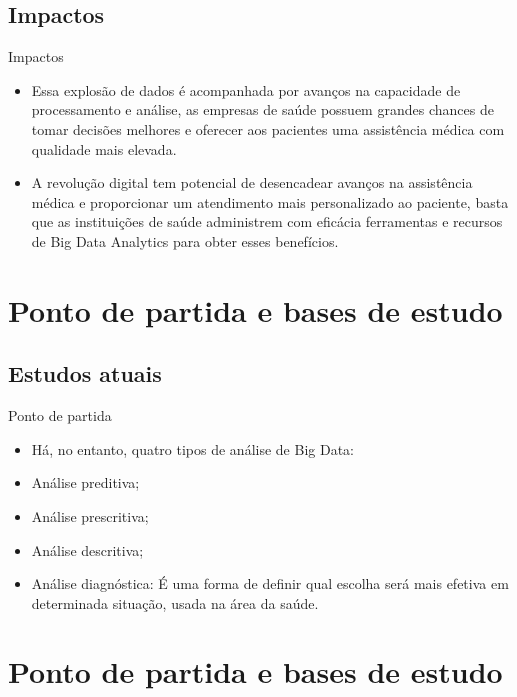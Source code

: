 \documentclass{beamer}
\begin{document}
\subsection{Impactos}
\begin{frame}{Impactos}
    \begin{itemize}
         \item{Essa explosão de dados é acompanhada por avanços na capacidade de processamento e análise, as empresas de saúde possuem grandes chances de tomar decisões melhores e oferecer aos pacientes uma assistência médica com qualidade mais elevada.
         }
         \item{A revolução digital tem potencial de desencadear avanços na assistência médica e proporcionar um atendimento mais personalizado ao paciente, basta que as instituições de saúde administrem com eficácia ferramentas e recursos de Big Data Analytics para obter esses benefícios.
         }
  \end{itemize}
\end{frame}

\section{Ponto de partida e bases de estudo}
\subsection{Estudos atuais}
\begin{frame}{Ponto de partida}
\begin{itemize}
\item Há, no entanto, quatro tipos de análise de Big Data:
    \item{Análise preditiva;}
    \item Análise prescritiva;
    \item Análise descritiva;
    \item Análise diagnóstica: É uma forma de definir qual escolha será mais efetiva em determinada situação, usada na área da saúde.
\end{itemize}
\end{frame}

\section{Ponto de partida e bases de estudo}
\end{document}
